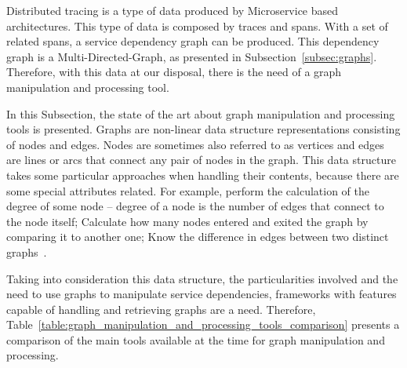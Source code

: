 Distributed tracing is a type of data produced by Microservice based architectures. This type of data is composed by traces and spans. With a set of related spans, a service dependency graph can be produced. This dependency graph is a Multi-Directed-Graph, as presented in Subsection~\ref{subsec:graphs}. Therefore, with this data at our disposal, there is the need of a graph manipulation and processing tool.

In this Subsection, the state of the art about graph manipulation and processing tools is presented. Graphs are non-linear data structure representations consisting of nodes and edges. Nodes are sometimes also referred to as vertices and edges are lines or arcs that connect any pair of nodes in the graph. This data structure takes some particular approaches when handling their contents, because there are some special attributes related. For example, perform the calculation of the degree of some node -- degree of a node is the number of edges that connect to the node itself; Calculate how many nodes entered and exited the graph by comparing it to another one; Know the difference in edges between two distinct graphs~\cite{Trudeau1993}.

Taking into consideration this data structure, the particularities involved and the need to use graphs to manipulate service dependencies, frameworks with features capable of handling and retrieving graphs are a need. Therefore, Table~\ref{table:graph_manipulation_and_processing_tools_comparison} presents a comparison of the main tools available at the time for graph manipulation and processing.

